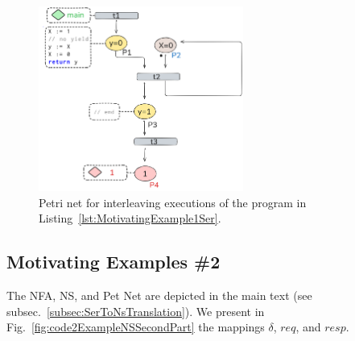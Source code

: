 \begin{figure}[H]
	\centering
	\includegraphics[width=0.6\textwidth]{plots/code_1_PN_with_annotation.png}
	\caption{Petri net for interleaving executions of the program in Listing~\ref{lst:MotivatingExample1Ser}.}
	\label{fig:code1ExamplePN}
\end{figure}


%

\subsection{Motivating Examples \#2}
\label{appendix:subsec::Ex1B:NS}

The NFA, NS, and Pet Net are depicted in the main text (see subsec.~\ref{subsec:SerToNsTranslation}).
%
We present in Fig.~\ref{fig:code2ExampleNSSecondPart} the mappings \(\delta\), $req$, and $resp$.

